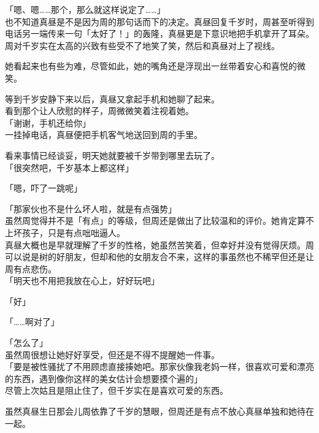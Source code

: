 「嗯、嗯……那个，那么就这样说定了……」\\

也不知道真昼是不是因为周的那句话而下的决定。真昼回复千岁时，周甚至听得到电话另一端传来一句「太好了！」的轰隆，真昼更是下意识地把手机拿开了耳朵。\\

周对千岁实在太高的兴致有些受不了地笑了笑，然后和真昼对上了视线。

她看起来也有些为难，尽管如此，她的嘴角还是浮现出一丝带着安心和喜悦的微笑。

等到千岁安静下来以后，真昼又拿起手机和她聊了起来。\\

看到那个让人欣慰的样子，周微微笑着注视着她。\\

「谢谢，手机还给你」\\

一挂掉电话，真昼便把手机客气地送回到周的手里。

看来事情已经谈妥，明天她就要被千岁带到哪里去玩了。\\

「很突然吧，千岁基本上都这样」

「嗯，吓了一跳呢」

「那家伙也不是什么坏人啦，就是有点强势」\\

虽然周觉得并不是「有点」的等级，但周还是做出了比较温和的评价。她肯定算不上坏孩子，只是有点咄咄逼人。\\

真昼大概也是早就理解了千岁的性格，她虽然苦笑着，但幸好并没有觉得厌烦。周可以说是树的好朋友，但却和他的女朋友合不来，这样的事虽然也不稀罕但还是让周有点悲伤。\\

「明天也不用把我放在心上，好好玩吧」

「好」

「……啊对了」

「怎么了」\\

虽然周很想让她好好享受，但还是不得不提醒她一件事。\\

「要是被性骚扰了不用顾虑直接揍她吧。那家伙像我老妈一样，很喜欢可爱和漂亮的东西，遇到像你这样的美女估计会想要摸个遍的」\\

尽管上次姑且是阻止住了，但千岁实在是喜欢可爱的东西。

虽然真昼生日那会儿周依靠了千岁的慧眼，但周还是有点不放心真昼单独和她待在一起。\\

